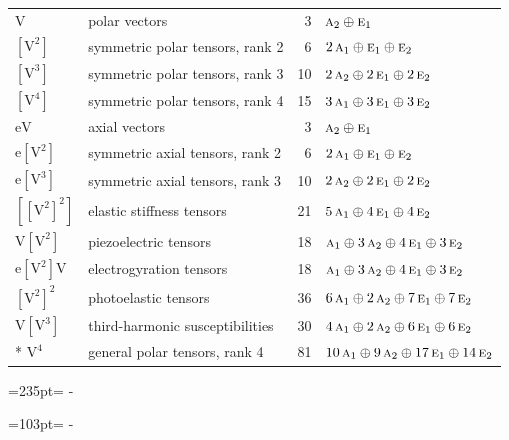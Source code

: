 \documentclass[10pt,a4paper]{article}
\newcommand{\needspace}[1]{\par\penalty-100\begingroup\dimen0=#1\relax\dimen2=\pagegoal
  \advance\dimen2-\pagetotal\ifdim\dimen0>\dimen2\relax\ifdim\dimen2>0pt\vfil\break\fi\fi
  \endgroup}
\numberwithin{equation}{section}
\newcommand{\irr}[1]{\text{\normalfont\scshape #1}}
\newcommand{\jahn}[1]{\mathrm{#1}}
\newlength{\fillwidth}\newlength{\cellwidth}\newlength{\colwidth}
\begin{document}
{\begin{longtable}{@{}llr>{\RaggedRight\arraybackslash}p{\fillwidth}@{}}
$\jahn{V}$ & polar vectors & 3 & $\irr{a}_{2} \oplus\allowbreak \irr{e}_{1}$\\
$\jahn{[V^{2}]}$ & symmetric polar tensors, rank 2 & 6 & $2\,\irr{a}_{1} \oplus\allowbreak \irr{e}_{1} \oplus\allowbreak \irr{e}_{2}$\\
$\jahn{[V^{3}]}$ & symmetric polar tensors, rank 3 & 10 & $2\,\irr{a}_{2} \oplus\allowbreak 2\,\irr{e}_{1} \oplus\allowbreak 2\,\irr{e}_{2}$\\
$\jahn{[V^{4}]}$ & symmetric polar tensors, rank 4 & 15 & $3\,\irr{a}_{1} \oplus\allowbreak 3\,\irr{e}_{1} \oplus\allowbreak 3\,\irr{e}_{2}$\\
$\jahn{eV}$ & axial vectors & 3 & $\irr{a}_{2} \oplus\allowbreak \irr{e}_{1}$\\
$\jahn{e[V^{2}]}$ & symmetric axial tensors, rank 2 & 6 & $2\,\irr{a}_{1} \oplus\allowbreak \irr{e}_{1} \oplus\allowbreak \irr{e}_{2}$\\
$\jahn{e[V^{3}]}$ & symmetric axial tensors, rank 3 & 10 & $2\,\irr{a}_{2} \oplus\allowbreak 2\,\irr{e}_{1} \oplus\allowbreak 2\,\irr{e}_{2}$\\
$\jahn{[[V^{2}]^{2}]}$ & elastic stiffness tensors & 21 & $5\,\irr{a}_{1} \oplus\allowbreak 4\,\irr{e}_{1} \oplus\allowbreak 4\,\irr{e}_{2}$\\
$\jahn{V[V^{2}]}$ & piezoelectric tensors & 18 & $\irr{a}_{1} \oplus\allowbreak 3\,\irr{a}_{2} \oplus\allowbreak 4\,\irr{e}_{1} \oplus\allowbreak 3\,\irr{e}_{2}$\\
$\jahn{e[V^{2}]V}$ & electrogyration tensors & 18 & $\irr{a}_{1} \oplus\allowbreak 3\,\irr{a}_{2} \oplus\allowbreak 4\,\irr{e}_{1} \oplus\allowbreak 3\,\irr{e}_{2}$\\
$\jahn{[V^{2}]^{2}}$ & photoelastic tensors & 36 & $6\,\irr{a}_{1} \oplus\allowbreak 2\,\irr{a}_{2} \oplus\allowbreak 7\,\irr{e}_{1} \oplus\allowbreak 7\,\irr{e}_{2}$\\
$\jahn{V[V^{3}]}$ & third-harmonic susceptibilities & 30 & $4\,\irr{a}_{1} \oplus\allowbreak 2\,\irr{a}_{2} \oplus\allowbreak 6\,\irr{e}_{1} \oplus\allowbreak 6\,\irr{e}_{2}$\\*
$\jahn{V^{4}}$ & general polar tensors, rank 4 & 81 & $10\,\irr{a}_{1} \oplus\allowbreak 9\,\irr{a}_{2} \oplus\allowbreak 17\,\irr{e}_{1} \oplus\allowbreak 14\,\irr{e}_{2}$\\
\bottomrule\end{longtable}}
\needspace{235pt}
\needspace{103pt}
\end{document}
